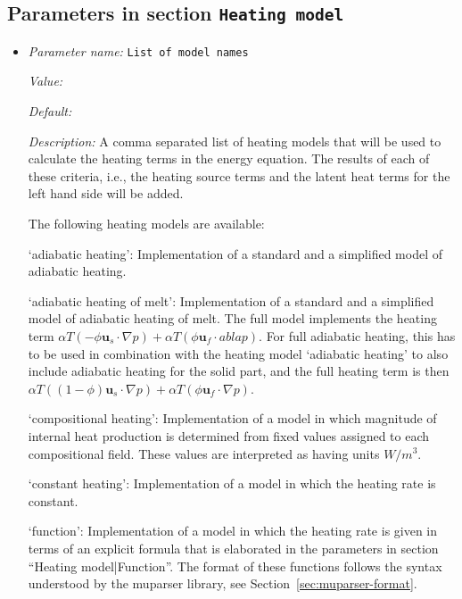 \subsection{Parameters in section \tt Heating model}
\label{parameters:Heating_20model}

\begin{itemize}
\item {\it Parameter name:} {\tt List of model names}
\label{parameters:Heating model/List of model names}
\label{parameters:Heating_20model/List_20of_20model_20names}


{\it Value:} 


{\it Default:} 


{\it Description:} A comma separated list of heating models that will be used to calculate the heating terms in the energy equation. The results of each of these criteria, i.e., the heating source terms and the latent heat terms for the left hand side will be added.

The following heating models are available:

`adiabatic heating': Implementation of a standard and a simplified model of adiabatic heating.

`adiabatic heating of melt': Implementation of a standard and a simplified model of adiabatic heating of melt. The full model implements the heating term 
$\alpha T (-\phi \mathbf u_s \cdot \nabla p) + \alpha T (\phi \mathbf u_f \cdot 
abla p)$.
For full adiabatic heating, this has to be used in combination with the heating model `adiabatic heating' to also include adiabatic heating for the solid part, and the full heating term is then $\alpha T ((1-\phi) \mathbf u_s \cdot \nabla p) + \alpha T (\phi \mathbf u_f \cdot \nabla p)$.

`compositional heating': Implementation of a model in which magnitude of internal heat production is determined from fixed values assigned to each compositional field. These values are interpreted as having units $W/m^3$.

`constant heating': Implementation of a model in which the heating rate is constant.

`function': Implementation of a model in which the heating rate is given in terms of an explicit formula that is elaborated in the parameters in section ``Heating model|Function''. The format of these functions follows the syntax understood by the muparser library, see Section~\ref{sec:muparser-format}.


\end{itemize}
